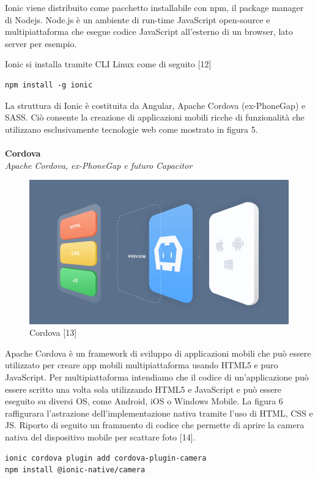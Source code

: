 Ionic viene distribuito come pacchetto installabile con npm, il package manager di Nodejs.
Node.js è un ambiente di run-time JavaScript open-source e multipiattaforma che esegue codice JavaScript all'esterno di un browser, lato server per esempio.

Ionic si installa tramite CLI Linux come di seguito [12]
\begin{lstlisting}
npm install -g ionic
\end{lstlisting}

La struttura di Ionic è costituita da Angular, Apache Cordova (ex-PhoneGap) e SASS. Ciò consente la creazione di applicazioni mobili ricche di funzionalità che utilizzano esclusivamente tecnologie web come mostrato in figura 5.
\\\\
\textbf{Cordova}\\
\textit{Apache Cordova, ex-PhoneGap e futuro Capacitor}

\begin{figure}[h!]
    \centering  
    \caption{Cordova [13]}
    \includegraphics[scale=0.80]{img/cap2/cordova}
\end{figure}

Apache Cordova è un framework di sviluppo di applicazioni mobili che può essere utilizzato per creare app mobili multipiattaforma usando HTML5 e puro JavaScript. 
Per multipiattaforma intendiamo che il codice di un'applicazione può essere scritto una volta sola utilizzando HTML5 e JavaScript e può essere eseguito su diversi OS, come Android, iOS o Windows Mobile.
La figura 6 raffigurara l'astrazione dell'implementazione nativa tramite l'uso di HTML, CSS e JS.
Riporto di seguito un frammento di codice che permette di aprire la camera nativa del dispositivo mobile per scattare foto [14].
\\
\begin{lstlisting}
ionic cordova plugin add cordova-plugin-camera
npm install @ionic-native/camera
\end{lstlisting}

